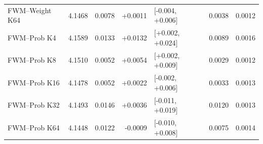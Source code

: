 \begin{tabular}{lrrrlrr}
FWM--Weight K64 & 4.1468 & 0.0078 & +0.0011 & [-0.004, +0.006] & 0.0038 & 0.0012 \\
FWM--Prob K4 & 4.1589 & 0.0133 & +0.0132 & [+0.002, +0.024] & 0.0089 & 0.0016 \\
FWM--Prob K8 & 4.1510 & 0.0052 & +0.0054 & [+0.002, +0.009] & 0.0029 & 0.0012 \\
FWM--Prob K16 & 4.1478 & 0.0052 & +0.0022 & [-0.002, +0.006] & 0.0033 & 0.0013 \\
FWM--Prob K32 & 4.1493 & 0.0146 & +0.0036 & [-0.011, +0.019] & 0.0120 & 0.0013 \\
FWM--Prob K64 & 4.1448 & 0.0122 & -0.0009 & [-0.010, +0.008] & 0.0075 & 0.0014 \\
\bottomrule
\end{tabular}

